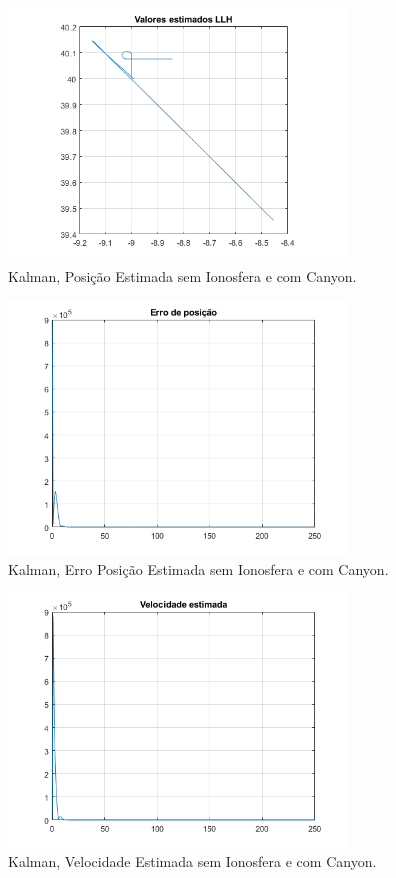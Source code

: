 \documentclass[palatino]{ist-report}
\begin{document}
\begin{figure}[ht]
	\centering
	\includegraphics[width=0.8\textwidth]{kalman_2/2-2-plot_posicao_estimada_LLH.png}
	\caption{Kalman, Posição Estimada sem Ionosfera e com Canyon.}
	\label{Posicao22}
\end{figure}

\begin{figure}[ht]
	\centering
	\includegraphics[width=0.8\textwidth]{kalman_2/2-2-erro_posicao.png}
	\caption{Kalman, Erro Posição Estimada sem Ionosfera e com Canyon.}
	\label{ePosicao22}
\end{figure}


\begin{figure}[ht]
	\centering
	\includegraphics[width=0.8\textwidth]{kalman_2/2-2-velocidade_estimada.png}
	\caption{Kalman, Velocidade Estimada sem Ionosfera e com Canyon.}
	\label{velocidade22}
\end{figure}
\end{document}
